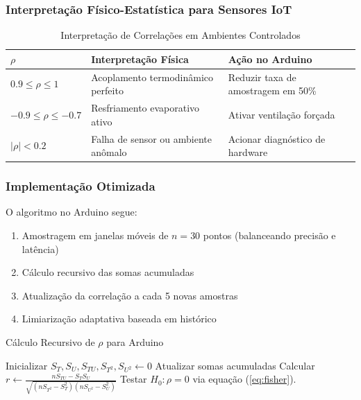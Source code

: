 \documentclass[12pt, a4paper]{article}
\begin{document}
\subsubsection{Interpretação Físico-Estatística para Sensores IoT}
\begin{table}[h]
    \centering
    \caption{Interpretação de Correlações em Ambientes Controlados}
    \begin{tabularx}{\linewidth}{|l|X|X|}
        \toprule
        \textbf{$\rho$} & \textbf{Interpretação Física} & \textbf{Ação no Arduino} \\
        \midrule
        $0.9 \leq \rho \leq 1$ & Acoplamento termodinâmico perfeito & Reduzir taxa de amostragem em 50\% \\
        \hline
        $-0.9 \leq \rho \leq -0.7$ & Resfriamento evaporativo ativo & Ativar ventilação forçada \\
        \hline
        $|\rho| < 0.2$ & Falha de sensor ou ambiente anômalo & Acionar diagnóstico de hardware \\
        \bottomrule
    \end{tabularx}
\end{table}

\subsubsection{Implementação Otimizada}
O algoritmo no Arduino segue:

\begin{enumerate}
    \item Amostragem em janelas móveis de $n=30$ pontos (balanceando precisão e latência)
    \item Cálculo recursivo das somas acumuladas
    \item Atualização da correlação a cada 5 novas amostras
    \item Limiarização adaptativa baseada em histórico
\end{enumerate}

\begin{algorithm}[H]
    \caption{Cálculo Recursivo de $\rho$ para Arduino}
    \begin{algorithmic}[1]
        \State Inicializar $S_T, S_U, S_{TU}, S_{T^2}, S_{U^2} \gets 0$
        \State Atualizar somas acumuladas
        \State Calcular $r \gets \frac{nS_{TU} - S_TS_U}{\sqrt{(nS_{T^2}-S_T^2)(nS_{U^2}-S_U^2)}}$
        \State Testar $H_0: \rho = 0$ via equação (\ref{eq:fisher}).
        \EndIf
        \EndFor
    \end{algorithmic}
\end{algorithm}
\end{document}
